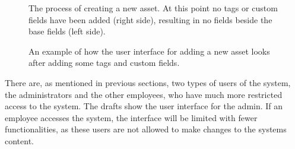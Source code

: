 \begin{figure}[H]
    \centering
    \caption{The process of creating a new asset. At this point no tags or custom fields have been added (right side), resulting in no fields beside the base fields (left side).}
    \label{fig:add_asset_no_tags}
\end{figure}

\begin{figure}[H]
    \centering
    \caption{An example of how the user interface for adding a new asset looks after adding some tags and custom fields.}
    \label{fig:add_asset_with_tags}
\end{figure}

There are, as mentioned in previous sections, two types of users of the system, the administrators and the other employees, who have much more restricted access to the system. The drafts show the user interface for the admin. If an employee accesses the system, the interface will be limited with fewer functionalities, as these users are not allowed to make changes to the systems content.
